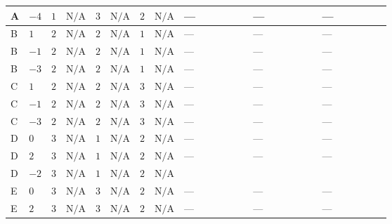\documentclass[8pt]{article}
\begin{document}
\begin{landscape}
\begin{longtable}{@{}llcccccc >{\raggedright\arraybackslash}p{0.21\linewidth} >{\raggedright\arraybackslash}p{0.21\linewidth} >{\raggedright\arraybackslash}p{0.21\linewidth}@{}}
\midrule
A & $-4$ & $1$ & $\text{N/A}$ & $3$ & $\text{N/A}$ & $2$ & $\text{N/A}$ & --- & --- & --- \\
\midrule
B & $1$ & $2$ & $\text{N/A}$ & $2$ & $\text{N/A}$ & $1$ & $\text{N/A}$ & --- & --- & --- \\
\midrule
B & $-1$ & $2$ & $\text{N/A}$ & $2$ & $\text{N/A}$ & $1$ & $\text{N/A}$ & --- & --- & --- \\
\midrule
B & $-3$ & $2$ & $\text{N/A}$ & $2$ & $\text{N/A}$ & $1$ & $\text{N/A}$ & --- & --- & --- \\
\midrule
C & $1$ & $2$ & $\text{N/A}$ & $2$ & $\text{N/A}$ & $3$ & $\text{N/A}$ & --- & --- & --- \\
\midrule
C & $-1$ & $2$ & $\text{N/A}$ & $2$ & $\text{N/A}$ & $3$ & $\text{N/A}$ & --- & --- & --- \\
\midrule
C & $-3$ & $2$ & $\text{N/A}$ & $2$ & $\text{N/A}$ & $3$ & $\text{N/A}$ & --- & --- & --- \\
\midrule
D & $0$ & $3$ & $\text{N/A}$ & $1$ & $\text{N/A}$ & $2$ & $\text{N/A}$ & --- & --- & --- \\
\midrule
D & $2$ & $3$ & $\text{N/A}$ & $1$ & $\text{N/A}$ & $2$ & $\text{N/A}$ & --- & --- & --- \\
\midrule
D & $-2$ & $3$ & $\text{N/A}$ & $1$ & $\text{N/A}$ & $2$ & $\text{N/A}$ & \scriptsize\adjustbox{max width=\linewidth}{$\begin{gathered} {\lambda_{X_{12}}} (6 \operatorname{Tr}\!\left({Y_d}\,\left({Y_d}\right)^{\dagger}\right)+2 \operatorname{Tr}\!\left({Y_e}\,\left({Y_e}\right)^{\dagger}\right)+6 \operatorname{Tr}\!\left({Y_u}\,\left({Y_u}\right)^{\dagger}\right))\end{gathered}$} & \scriptsize\adjustbox{max width=\linewidth}{$\begin{gathered} +4 {\lambda_{X_{7}}^{(1)}} \left({\lambda_5}\right)^{*}\end{gathered}$} & \scriptsize\adjustbox{max width=\linewidth}{$\begin{gathered} +8 {\lambda_{X_{16}}} \left({\lambda_5}\right)^{*}\end{gathered}$} \\
\midrule
E & $0$ & $3$ & $\text{N/A}$ & $3$ & $\text{N/A}$ & $2$ & $\text{N/A}$ & --- & --- & --- \\
\midrule
E & $2$ & $3$ & $\text{N/A}$ & $3$ & $\text{N/A}$ & $2$ & $\text{N/A}$ & --- & --- & --- \\
\midrule

\end{longtable}
\end{landscape}
\end{document}
